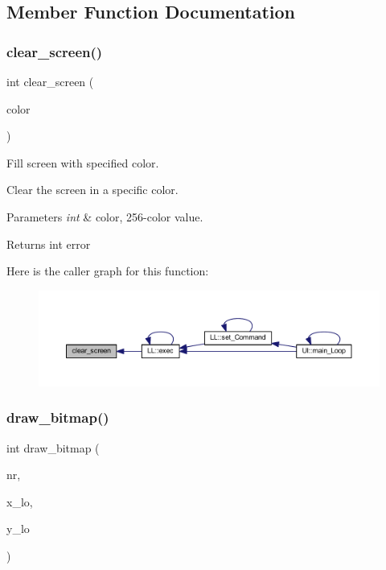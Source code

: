 \subsection{Member Function Documentation}
\mbox{\label{class_vgascreen_a5420000fe45606af438d6de37cb59fa4}} 
\subsubsection{\texorpdfstring{clear\+\_\+screen()}{clear\_screen()}}
{\footnotesize\ttfamily int clear\+\_\+screen (\begin{DoxyParamCaption}\item[{int}]{color }\end{DoxyParamCaption})}



Fill screen with specified color. 

Clear the screen in a specific color.


\begin{DoxyParams}{Parameters}
{\em int} & color, 256-\/color value. \\
\hline
\end{DoxyParams}
\begin{DoxyReturn}{Returns}
int error 
\end{DoxyReturn}
Here is the caller graph for this function\+:\nopagebreak
\begin{figure}[H]
\begin{center}
\leavevmode
\includegraphics[width=350pt]{class_vgascreen_a5420000fe45606af438d6de37cb59fa4_icgraph}
\end{center}
\end{figure}
\mbox{\label{class_vgascreen_ad523b2dd47a6f2adde2d40cf1d809f27}} 
\subsubsection{\texorpdfstring{draw\+\_\+bitmap()}{draw\_bitmap()}}
{\footnotesize\ttfamily int draw\+\_\+bitmap (\begin{DoxyParamCaption}\item[{int}]{nr,  }\item[{int}]{x\+\_\+lo,  }\item[{int}]{y\+\_\+lo }\end{DoxyParamCaption})}



